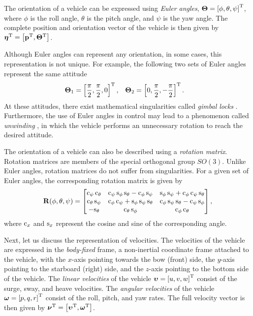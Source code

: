 The orientation of a vehicle can be expressed using \emph{Euler angles}, $\bm{\Theta} = \left[\phi, \theta, \psi\right]^{\mathrm{T}}$, where $\phi$ is the roll angle, $\theta$ is the pitch angle, and $\psi$ is the yaw angle.
The complete position and orientation vector of the vehicle is then given by $\bm{\eta}^{\mathrm{T}} = \left[\mathbf{p}^{\mathrm{T}}, \bm{\Theta}^{\mathrm{T}}\right]$.

Although Euler angles can represent any orientation,
in some cases, this representation is not unique.
For example, the following two sets of Euler angles represent the same attitude
\begin{align}
    \bm{\Theta}_1 &= \left[\frac{\pi}{2}, \frac{\pi}{2}, 0\right]^{\mathrm{T}}, &
    \bm{\Theta}_2 &= \left[0, \frac{\pi}{2}, -\frac{\pi}{2}\right]^{\mathrm{T}}. &
\end{align}
At these attitudes, there exist mathematical singularities called \emph{gimbal locks} \cite{chaturvedi_rigid-body_2011}.
Furthermore, the use of Euler angles in control may lead to a phenomenon called \emph{unwinding} \cite{sanjay_topological_2000}, in which the vehicle performs an unnecessary rotation to reach the desired attitude.

The orientation of a vehicle can also be described using a \emph{rotation matrix}.
Rotation matrices are members of the special orthogonal group $SO(3)$.
Unlike Euler angles, rotation matrices do not suffer from singularities.
For a given set of Euler angles, the corresponding rotation matrix is given by \cite{fossen_handbook_2011}
\begin{equation}
    \mathbf{R}(\phi, \theta, \psi)
    =
    \begin{bmatrix} 
        {\rm c}_{\psi}\,{\rm c}_{\theta} & {\rm c}_{\psi}\,{\rm s}_{\phi}\,{\rm s}_{\theta}-{\rm c}_{\phi}\,{\rm s}_{\psi} & {\rm s}_{\phi}\,{\rm s}_{\psi}+{\rm c}_{\phi}\,{\rm c}_{\psi}\,{\rm s}_{\theta}\\ {\rm c}_{\theta}\,{\rm s}_{\psi} & {\rm c}_{\phi}\,{\rm c}_{\psi}+{\rm s}_{\phi}\,{\rm s}_{\psi}\,{\rm s}_{\theta} & {\rm c}_{\phi}\,{\rm s}_{\psi}\,{\rm s}_{\theta}-{\rm c}_{\psi}\,{\rm s}_{\phi}\\ -{\rm s}_{\theta} & {\rm c}_{\theta}\,{\rm s}_{\phi} & {\rm c}_{\phi}\,{\rm c}_{\theta} 
    \end{bmatrix},
    \label{eq:background_Rzyx}
\end{equation}
where ${\rm c}_x$ and ${\rm s}_x$ represent the cosine and sine of the corresponding angle.

Next, let us discuss the representation of velocities.
The velocities of the vehicle are expressed in the \emph{body-fixed} frame, a non-inertial coordinate frame attached to the vehicle, with the $x$-axis pointing towards the bow (front) side, the $y$-axis pointing to the starboard (right) side, and the $z$-axis pointing to the bottom side of the vehicle.
The \emph{linear velocities} of the vehicle $\bm{\upsilon} = \left[u, v, w\right]^{\mathrm{T}}$ consist of the surge, sway, and heave velocities.
The \emph{angular velocities} of the vehicle $\bm{\omega} = \left[p, q, r\right]^{\mathrm{T}}$ consist of the roll, pitch, and yaw rates.
The full velocity vector is then given by $\bm{\nu}^{\mathrm{T}} = \left[\bm{\upsilon}^{\mathrm{T}}, \bm{\omega}^{\mathrm{T}}\right]$.

